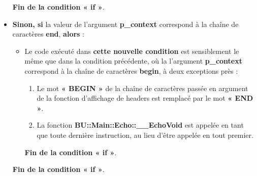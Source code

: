 \documentclass[a4paper,10pt]{article}
\begin{document}
\begin{itemize}
{\begin{itemize}
{                \begin{justify}
                    \textbf{\color{cond}Fin de la condition « if »}.
                \end{justify}
            }
        \end{itemize}
    }

    \item
    {
        \setlength{\parskip}{2em}

        \begin{justify}
            \textbf{\color{cond}Sinon, si} la valeur de l'argument \textbf{\color{vars}p\_context} correspond à la chaîne de caractères \textbf{end}, \textbf{\color{cond}alors} :
        \end{justify}

        \setlength{\parskip}{1em}

        \begin{itemize}
            \item
            {
                \begin{justify}
                    Le code exécuté dans \textbf{\color{cond}cette nouvelle condition} est sensiblement le même que dans la condition précédente, où la l'argument \textbf{\color{vars}p\_context} correspond à la chaîne de caractères \textbf{begin}, à deux exceptions près :

                    \begin{enumerate}
                        \item Le mot \textbf{« BEGIN »} de la chaîne de caractères passée en argument de la fonction d'affichage de headers est remplacé par le mot \textbf{« END »}.

                        \item La fonction \textbf{\color{func}BU::Main::Echo::\_\_EchoVoid} est appelée en tant que toute dernière instruction, au lieu d'être appelée en tout premier.
                    \end{enumerate}
                \end{justify}\setlength{\parskip}{1em}

                \begin{justify}
                    \textbf{\color{cond}Fin de la condition « if »}.
                \end{justify}
            }
        \end{itemize}

        \begin{justify}
            \textbf{\color{cond}Fin de la condition « if »}.
        \end{justify}
    }
\end{itemize}
\end{document}
